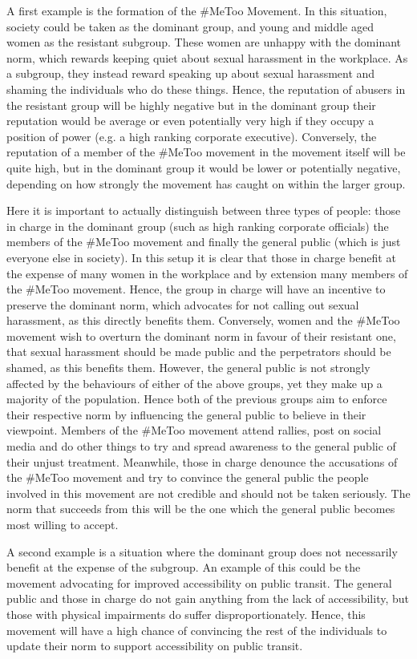 \documentclass[12pt]{article}
\begin{document}
A first example is the formation of the \#MeToo Movement. In this situation, society
could be taken as the dominant group, and young and middle aged women as the resistant subgroup.
These women are unhappy with the dominant norm, which rewards keeping quiet about
sexual harassment in the workplace. As a subgroup, they instead reward speaking
up about sexual harassment and shaming the individuals who do these things.
Hence, the reputation of abusers in the resistant group will be highly negative
but in the dominant group their reputation would be average or even potentially very high
if they occupy a position of power (e.g. a high ranking corporate executive). Conversely,
the reputation of a member of the \#MeToo movement in the movement itself will be quite high,
but in the dominant group it would be lower or potentially negative, depending on how strongly
the movement has caught on within the larger group.

Here it is important to actually distinguish between three types of people:
those in charge in the dominant group (such as high ranking corporate officials)
the members of the \#MeToo movement and finally the general public (which is just everyone else in society). In this setup
it is clear that those in charge benefit at the expense of many women in the workplace
and by extension many members of the \#MeToo movement. Hence, the group in charge
will have an incentive to preserve the dominant norm, which advocates for not calling out sexual harassment,
as this directly benefits them. Conversely, women and the \#MeToo movement wish to overturn the dominant
norm in favour of their resistant one, that sexual harassment should be made public and the perpetrators
should be shamed, as this benefits them. However, the general public is not strongly affected by the behaviours
of either of the above groups, yet they make up a majority of the population. Hence
both of the previous groups aim to enforce their respective norm by influencing the general public
to believe in their viewpoint. Members of the \#MeToo movement attend rallies, post on social media
and do other things to try and spread awareness to the general public of their unjust treatment. Meanwhile,
those in charge denounce the accusations of the \#MeToo movement and try to convince
the general public the people involved in this movement are not credible and should not be taken seriously.
The norm that succeeds from this will be the one which the general public becomes most willing to accept.

A second example is a situation where the dominant group does not necessarily
benefit at the expense of the subgroup. An example of this could be the
movement advocating for improved accessibility on public transit. The general public and those in charge
do not gain anything from the lack of accessibility, but those with physical impairments
do suffer disproportionately. Hence, this movement will have a high chance of convincing the rest
of the individuals to update their norm to support accessibility on public transit.
\end{document}
